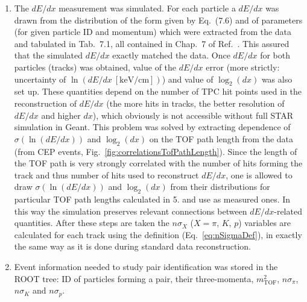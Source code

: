 \begin{enumerate}
 \item The $dE/dx$ measurement was simulated. For each particle a $dE/dx$ was drawn from the distribution of the form given by Eq.~(7.6) and of parameters (for given particle ID and momentum) which were extracted from the data and tabulated in Tab.~7.1, all contained in Chap.~7 of Ref.~\cite{supplementaryNote}. This assured that the simulated $dE/dx$ exactly matched the data. Once $dE/dx$ for both particles (tracks) was obtained, value of the $dE/dx$ error (more strictly: uncertainty of $\ln(dE/dx~[\text{keV/cm}])$) and value of $\log_{2}(dx)$ was also set up. These quantities depend on the number of TPC hit points used in the reconstruction of $dE/dx$ (the more hits in tracks, the better resolution of $dE/dx$ and higher $dx$), which obviously is not accessible without full STAR simulation in Geant. This problem was solved by extracting dependence of $\sigma(\ln(dE/dx))$ and $\log_{2}(dx)$ on the TOF path length from the data (from CEP events, Fig.~\ref{fig:correlationsTofPathLength}). Since the length of the TOF path is very strongly correlated with the number of hits forming the track and thus number of hits used to reconstruct $dE/dx$, one is allowed to draw $\sigma(\ln(dE/dx))$ and $\log_{2}(dx)$ from their distributions for particular TOF path lengths calculated in 5. and use as measured ones. In this way the simulation preserves relevant connections between $dE/dx$-related quantities. After these steps are taken the $n\sigma_{X}$ ($X=\pi$, $K$, $p$) variables are calculated for each track using the definition (Eq.~\eqref{eq:nSigmaDef}), in exactly the same way as it is done during standard data reconstruction.
 \item Event information needed to study pair identification was stored in the ROOT tree: ID of particles forming a pair, their three-momenta, $m^{2}_{\text{TOF}}$, $n\sigma_{\pi}$, $n\sigma_{K}$ and $n\sigma_{p}$.
\end{enumerate}

